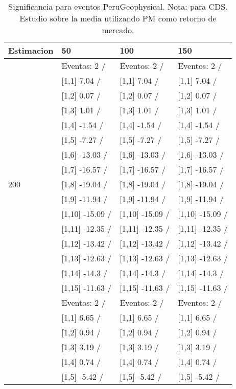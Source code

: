 \begin{table}

\caption{Significancia para eventos PeruGeophysical. Nota: para CDS. Estudio sobre la media utilizando PM como retorno de mercado.}
\centering
\begin{tabular}[t]{llll}
\toprule
Estimacion & 50 & 100 & 150\\
\midrule
 & Eventos:  2 / & Eventos:  2 / & Eventos:  2 /\\
 & {}[1,1] 7.04  / & {}[1,1] 7.04  / & {}[1,1] 7.04  /\\
 & {}[1,2] 0.07  / & {}[1,2] 0.07  / & {}[1,2] 0.07  /\\
 & {}[1,3] 1.01  / & {}[1,3] 1.01  / & {}[1,3] 1.01  /\\
 & {}[1,4] -1.54  / & {}[1,4] -1.54  / & {}[1,4] -1.54  /\\
\addlinespace
 & {}[1,5] -7.27  / & {}[1,5] -7.27  / & {}[1,5] -7.27  /\\
 & {}[1,6] -13.03  / & {}[1,6] -13.03  / & {}[1,6] -13.03  /\\
 & {}[1,7] -16.57  / & {}[1,7] -16.57  / & {}[1,7] -16.57  /\\
200 & {}[1,8] -19.04  / & {}[1,8] -19.04  / & {}[1,8] -19.04  /\\
 & {}[1,9] -11.94  / & {}[1,9] -11.94  / & {}[1,9] -11.94  /\\
\addlinespace
 & {}[1,10] -15.09  / & {}[1,10] -15.09  / & {}[1,10] -15.09  /\\
 & {}[1,11] -12.35  / & {}[1,11] -12.35  / & {}[1,11] -12.35  /\\
 & {}[1,12] -13.42  / & {}[1,12] -13.42  / & {}[1,12] -13.42  /\\
 & {}[1,13] -12.63  / & {}[1,13] -12.63  / & {}[1,13] -12.63  /\\
 & {}[1,14] -14.3  / & {}[1,14] -14.3  / & {}[1,14] -14.3  /\\
\addlinespace
 & {}[1,15] -11.63  / & {}[1,15] -11.63  / & {}[1,15] -11.63  /\\
 & Eventos:  2 / & Eventos:  2 / & Eventos:  2 /\\
 & {}[1,1] 6.65  / & {}[1,1] 6.65  / & {}[1,1] 6.65  /\\
 & {}[1,2] 0.94  / & {}[1,2] 0.94  / & {}[1,2] 0.94  /\\
 & {}[1,3] 3.19  / & {}[1,3] 3.19  / & {}[1,3] 3.19  /\\
\addlinespace
 & {}[1,4] 0.74  / & {}[1,4] 0.74  / & {}[1,4] 0.74  /\\
 & {}[1,5] -5.42  / & {}[1,5] -5.42  / & {}[1,5] -5.42  /\\

\end{tabular}
\end{table}

